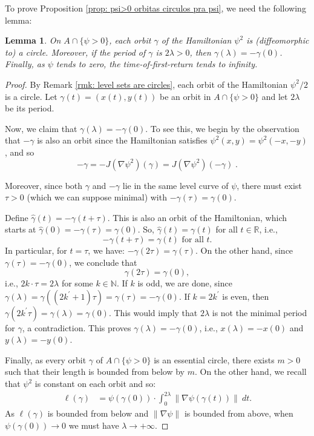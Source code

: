 \documentclass[11pt,reqno]{amsart}
\theoremstyle{plain}
\newtheorem{lemma}[theorem]{Lemma}
\theoremstyle{definition}
\theoremstyle{remark}
\theoremstyle{plain}
\numberwithin{equation}{section}
\newcommand{\R}{\mathbb{R}}
\newcommand{\N}{\mathbb{N}}
\begin{document}
								To prove Proposition \ref{prop: psi>0 orbitas circulos pra psi}, we need the following  lemma:
								\begin{lemma} \label{lemma: psi>0 (x,y) circulos}
									On $A\cap \{\psi >0\}$,  each orbit $\gamma$ of the Hamiltonian $\psi^2$ is (diffeomorphic to) a circle. Moreover, if the period of $\gamma$ is $2\lambda>0$, then $\gamma(\lambda)=-\gamma(0)$. Finally, 
									as $\psi$ tends to zero, the time-of-first-return tends to infinity.
								\end{lemma}
								\begin{proof}
									By Remark \ref{rmk: level sets are circles}, each orbit of the Hamiltonian $\psi^{2}/2$ is a circle. Let $\gamma(t)=(x(t),y(t))$ be an orbit in $A\cap \{\psi >0\}$ and let $2\lambda$ be its period. 
									
									Now, we claim that $\gamma(\lambda)=-\gamma(0)$. To see this, we begin by the observation that $ -\gamma $ is also an orbit since the Hamiltonian satisfies $\psi^2(x,y)=\psi^2(-x,-y)$, and so 
									\[ -\gamma = -J (\nabla \psi^2 )(\gamma)= J (\nabla \psi^2 )(-\gamma)\;  . \]
									
									Moreover, since both $ \gamma $ and $-\gamma $ lie in the same level curve of $\psi$, there must exist $\tau>0$ (which we can suppose minimal) with $- \gamma (\tau)=\gamma(0)$.
									
									Define $\widehat{\gamma}(t)=-\gamma(t+\tau)$. This is also an orbit of the Hamiltonian, which starts at $\widehat{\gamma}(0)=-\gamma(\tau)= \gamma(0)$.  So, $\widehat{\gamma}(t)=\gamma(t)$ for all $t\in \R$, i.e., 
									$$-\gamma(t+\tau)=\gamma(t)\text{ for all $t$.}$$
									In particular, for $t=\tau$, we have: $-\gamma(2\tau)=\gamma(\tau).$ On the other hand, since $\gamma(\tau)=-\gamma(0) $, we conclude that $$\gamma(2\tau)=\gamma(0),$$ i.e., $2k\cdot \tau=2\lambda$ for some $k\in \N$. If $k$ is odd, we are done, since $\gamma(\lambda)=\gamma((2k^{\prime} +1)\tau)=\gamma(\tau)=-\gamma(0)$.  If  $k=2k^{\prime}$ is even, then   $\gamma(2k^\prime \tau)=\gamma(\lambda)=\gamma(0)$. This would imply that $2\lambda$ is not the minimal period for $\gamma$, a contradiction. This proves $\gamma(\lambda)=-\gamma(0)$, i.e., $x(\lambda)=-x(0)$ and $y(\lambda)=-y(0)$.
									
									

									Finally, as every orbit $\gamma$ of $A\cap \{\psi >0\}$ is an essential circle, there exists $m>0$ such that their length is bounded from below by $m$. On the other hand, we recall that $\psi^2$ is constant on each orbit and so:
									\begin{align*}
										\ell(\gamma)&=\psi(\gamma(0))\cdot\int_{0}^{2\lambda} \|\nabla \psi (\gamma(t)) \| \ dt.
									\end{align*} 
									As $ \ell(\gamma)$ is bounded from below and $\|\nabla \psi\|$ is bounded from above, when $\psi(\gamma(0))\to 0$ we must have   $\lambda \to +\infty$.
									\end{proof} 
									
\end{document}
